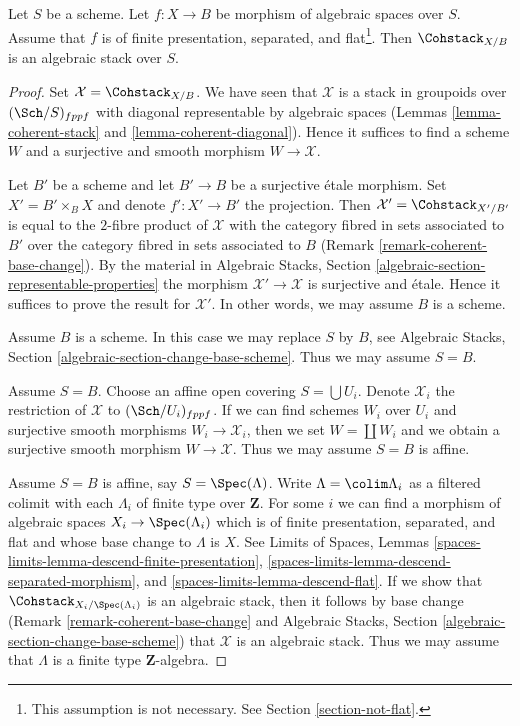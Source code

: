 \begin{theorem}
\label{theorem-coherent-algebraic}
Let $S$ be a scheme. Let $f : X \to B$ be morphism of algebraic spaces
over $S$. Assume that $f$ is of finite presentation, separated, and
flat\footnote{This assumption is not necessary. See
Section \ref{section-not-flat}.}. Then $\Cohstack_{X/B}$ is
an algebraic stack over $S$.
\end{theorem}

\begin{proof}
Set $\mathcal{X} = \Cohstack_{X/B}$. We have seen that $\mathcal{X}$
is a stack in groupoids over $(\Sch/S)_{fppf}$ with diagonal representable
by algebraic spaces
(Lemmas \ref{lemma-coherent-stack} and \ref{lemma-coherent-diagonal}).
Hence it suffices to find a scheme $W$ and a surjective and smooth
morphism $W \to \mathcal{X}$.

\medskip\noindent
Let $B'$ be a scheme and let $B' \to B$ be a surjective \'etale morphism.
Set $X' = B' \times_B X$ and denote $f' : X' \to B'$ the projection.
Then $\mathcal{X}' = \Cohstack_{X'/B'}$ is equal to the $2$-fibre
product of $\mathcal{X}$ with the category fibred in sets
associated to $B'$ over the category fibred in sets associated to $B$
(Remark \ref{remark-coherent-base-change}). By the material in
Algebraic Stacks, Section \ref{algebraic-section-representable-properties}
the morphism $\mathcal{X}' \to \mathcal{X}$ is surjective and \'etale.
Hence it suffices to prove the result for $\mathcal{X}'$.
In other words, we may assume $B$ is a scheme.

\medskip\noindent
Assume $B$ is a scheme. In this case we may replace $S$ by $B$, see
Algebraic Stacks, Section \ref{algebraic-section-change-base-scheme}.
Thus we may assume $S = B$.

\medskip\noindent
Assume $S = B$. Choose an affine open covering $S = \bigcup U_i$.
Denote $\mathcal{X}_i$ the restriction of $\mathcal{X}$ to
$(\Sch/U_i)_{fppf}$. If we can find schemes $W_i$ over $U_i$ and
surjective smooth morphisms $W_i \to \mathcal{X}_i$, then we
set $W = \coprod W_i$ and we obtain a surjective smooth morphism
$W \to \mathcal{X}$. Thus we may assume $S = B$ is affine.

\medskip\noindent
Assume $S = B$ is affine, say $S = \Spec(\Lambda)$.
Write $\Lambda = \colim \Lambda_i$ as a filtered colimit with each $\Lambda_i$
of finite type over $\mathbf{Z}$. For some $i$ we can find
a morphism of algebraic spaces $X_i \to \Spec(\Lambda_i)$
which is of finite presentation, separated, and flat and whose base change
to $\Lambda$ is $X$. See
Limits of Spaces, Lemmas
\ref{spaces-limits-lemma-descend-finite-presentation},
\ref{spaces-limits-lemma-descend-separated-morphism}, and
\ref{spaces-limits-lemma-descend-flat}.
If we show that $\Cohstack_{X_i/\Spec(\Lambda_i)}$ is an
algebraic stack, then it follows by base change
(Remark \ref{remark-coherent-base-change} and
Algebraic Stacks, Section \ref{algebraic-section-change-base-scheme})
that $\mathcal{X}$ is an algebraic stack.
Thus we may assume that $\Lambda$ is a finite type $\mathbf{Z}$-algebra.


\end{proof}
